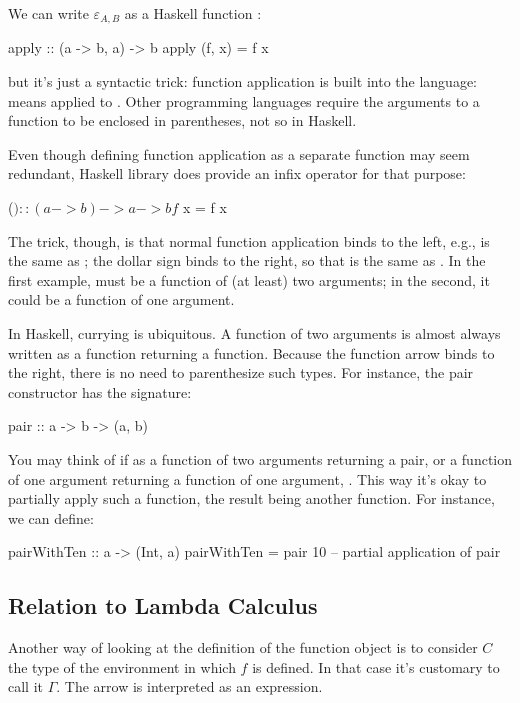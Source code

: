 \documentclass[DaoFP]{subfiles}
\begin{document}
We can write $\varepsilon_{A, B}$ as a Haskell function :
\begin{haskell}
apply :: (a -> b, a) -> b
apply (f, x) = f x
\end{haskell}
but it's just a syntactic trick: function application is built into the language:  means  applied to . Other programming languages require the arguments to a function to be enclosed in parentheses, not so in Haskell. 

Even though defining function application as a separate function may seem redundant, Haskell library does provide an infix operator \hask{$} for that purpose:
\begin{haskell}
($) :: (a -> b) -> a -> b
f $ x = f x
\end{haskell}
The trick, though, is that normal function application binds to the left, e.g.,  is the same as ; the dollar sign binds to the right, so that  is the same as . In the first example,  must be a function of (at least) two arguments; in the second, it could be a function of one argument.

In Haskell, currying is ubiquitous. A function of two arguments is almost always written as a function returning a function. Because the function arrow \hask{->} binds to the right, there is no need to parenthesize such types. For instance, the pair constructor has the signature:
\begin{haskell}
pair :: a -> b -> (a, b)
\end{haskell}
You may think of if as a function of two arguments returning a pair, or a function of one argument returning a function of one argument, . This way it's okay to partially apply such a function, the result being another function. For instance, we can define:
\begin{haskell}
pairWithTen :: a -> (Int, a)
pairWithTen = pair 10 -- partial application of pair
\end{haskell}



\subsection{Relation to Lambda Calculus}

Another way of looking at the definition of the function object is to consider $C$ the type of the environment in which $f$ is defined. In that case it's customary to call it $\Gamma$. The arrow is interpreted as an expression. 
\end{document}
